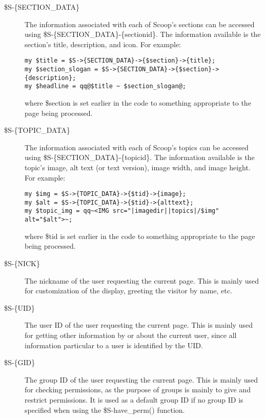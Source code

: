 \begin{description}
\item[\$S-\latexhtml{$>$}{>}\{SECTION\_DATA\}] The information associated with each of Scoop's sections can be accessed using \$S-\latexhtml{$>$}{>}\{SECTION\_DATA\}-\latexhtml{$>$}{>}\{sectionid\}. The information available is the section's title, description, and icon. For example:
\begin{verbatim}
my $title = $S->{SECTION_DATA}->{$section}->{title};
my $section_slogan = $S->{SECTION_DATA}->{$section}->{description};
my $headline = qq@$title ~ $section_slogan@;
\end{verbatim}
where \$section is set earlier in the code to something appropriate to the page being processed.

\item[\$S-\latexhtml{$>$}{>}\{TOPIC\_DATA\}] The information associated with each of Scoop's topics can be accessed using \$S-\latexhtml{$>$}{>}\{SECTION\_DATA\}-\latexhtml{$>$}{>}\{topicid\}. The information available is the topic's image, alt text (or text version), image width, and image height. For example:
\begin{verbatim}
my $img = $S->{TOPIC_DATA}->{$tid}->{image};
my $alt = $S->{TOPIC_DATA}->{$tid}->{alttext};
my $topic_img = qq~<IMG src="|imagedir||topics|/$img" alt="$alt">~;
\end{verbatim}
where \$tid is set earlier in the code to something appropriate to the page being processed.

\item[\$S-\latexhtml{$>$}{>}\{NICK\}] The nickname of the user requesting the current page. This is mainly used for customization of the display, greeting the visitor by name, etc.

\item[\$S-\latexhtml{$>$}{>}\{UID\}] The user ID of the user requesting the current page. This is mainly used for getting other information by or about the current user, since all information particular to a user is identified by the UID.

\item[\$S-\latexhtml{$>$}{>}\{GID\}] The group ID of the user requesting the current page. This is mainly used for checking permissions, as the purpose of groups is mainly to give and restrict permissions. It is used as a default group ID if no group ID is specified when using the \$S-\latexhtml{$>$}{>}have\_perm() function.

\end{description}

